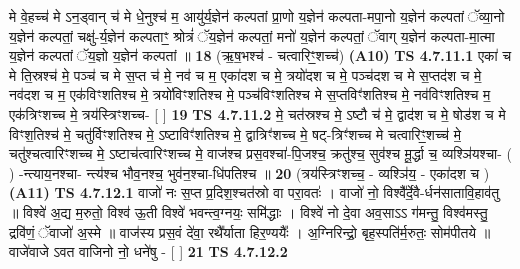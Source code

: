 \documentclass[17pt]{extarticle}
\begin{document}
                  मे वे॒हच्च॑ मे ऽन॒ड्वान् च॑ मे धे॒नुश्च॑ म॒ आयु॑र्य॒ज्ञेन॑ कल्पतां प्रा॒णो य॒ज्ञेन॑ कल्पता-मपा॒नो य॒ज्ञेन॑ कल्पतां ॅव्या॒नो य॒ज्ञेन॑ कल्पतां॒ चक्षु॑-र्य॒ज्ञेन॑ कल्पताꣳ॒॒ श्रोत्रं॑ ॅय॒ज्ञेन॑ कल्पतां॒ मनो॑ य॒ज्ञेन॑ कल्पतां॒ ॅवाग् य॒ज्ञेन॑ कल्पता-मा॒त्मा य॒ज्ञेन॑ कल्पतां ॅय॒ज्ञो य॒ज्ञेन॑ कल्पतां ॥ \textbf{  18 } \newline
                  \newline
                      (ऋ॒ष॒भश्च॑ - चत्वारिꣳ॒॒शच्च॑)  \textbf{(A10)} \newline \newline
                                        \textbf{ TS 4.7.11.1} \newline
                  एका॑ च मे ति॒स्रश्च॑ मे॒ पञ्च॑ च मे स॒प्त च॑ मे॒ नव॑ च म॒ एका॑दश च मे॒ त्रयो॑दश च मे॒ पञ्च॑दश च मे स॒प्तद॑श च मे॒ नव॑दश च म॒ एक॑विꣳशतिश्च मे॒ त्रयो॑विꣳशतिश्च मे॒ पञ्च॑विꣳशतिश्च मे स॒प्तविꣳ॑शतिश्च मे॒ नव॑विꣳशतिश्च म॒ एक॑त्रिꣳशच्च मे॒ त्रय॑स्त्रिꣳशच्च- [  ] \textbf{  19} \newline
                  \newline
                                \textbf{ TS 4.7.11.2} \newline
                  मे॒ चत॑स्रश्च मे॒ ऽष्टौ च॑ मे॒ द्वाद॑श च मे॒ षोड॑श च मे विꣳश॒तिश्च॑ मे॒ चतु॑र्विꣳशतिश्च मे॒ ऽष्टाविꣳ॑शतिश्च मे॒ द्वात्रिꣳ॑शच्च मे॒ षट्-त्रिꣳ॑शच्च मे चत्वारिꣳ॒॒शच्च॑ मे॒ चतु॑श्चत्वारिꣳशच्च मे॒ ऽष्टाच॑त्वारिꣳशच्च मे॒ वाज॑श्च प्रस॒वश्चा॑-पि॒जश्च॒ क्रतु॑श्च॒ सुव॑श्च मू॒र्द्धा च॒ व्यश्ञि॑यश्चा- ( ) -न्त्याय॒नश्चा- न्त्य॑श्च भौव॒नश्च॒ भुव॑न॒श्चा-धि॑पतिश्च ॥ \textbf{  20 } \newline
                  \newline
                      (त्रय॑स्त्रिꣳशच्च॒ - व्यश्ञि॑य॒ - एका॑दश च )  \textbf{(A11)} \newline \newline
                                        \textbf{ TS 4.7.12.1} \newline
                  वाजो॑ नः स॒प्त प्र॒दिश॒श्चत॑स्रो वा परा॒वतः॑ । वाजो॑ नो॒ विश्वै᳚र्दे॒वै-र्धन॑सातावि॒हाव॑तु ॥ विश्वे॑ अ॒द्य म॒रुतो॒ विश्व॑ ऊ॒ती विश्वे॑ भवन्त्व॒ग्नयः॒ समि॑द्धाः । विश्वे॑ नो दे॒वा अव॒साऽऽ ग॑मन्तु॒ विश्व॑मस्तु॒ द्रवि॑णं॒ ॅवाजो॑ अ॒स्मे ॥ वाज॑स्य प्रस॒वं दे॑वा॒ रथै᳚र्याता हिर॒ण्ययैः᳚ । अ॒ग्निरिन्द्रो॒ बृह॒स्पति॑र्म॒रुतः॒ सोम॑पीतये ॥ वाजे॑वाजे ऽवत वाजिनो नो॒ धने॑षु - [  ] \textbf{  21} \newline
                  \newline
                                \textbf{ TS 4.7.12.2} \newline
\end{document}
